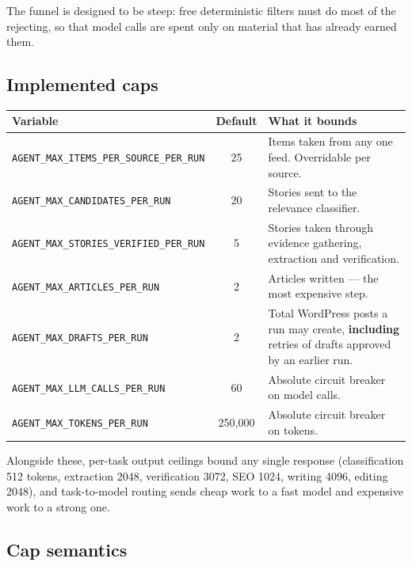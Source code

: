 \documentclass[11pt,a4paper]{article}
\newcommand{\var}[1]{\texttt{\small\hyphenpenalty=0\exhyphenpenalty=0\relax #1}}
\newcommand{\us}{\_\discretionary{}{}{}}
\begin{document}
The funnel is designed to be steep: free deterministic filters must do most of the
rejecting, so that model calls are spent only on material that has already earned
them.

\subsection{Implemented caps}

\begin{center}
\small
\begin{tabularx}{\textwidth}{@{}>{\RaggedRight}p{5.2cm} c >{\RaggedRight}X@{}}
\toprule
\textbf{Variable} & \textbf{Default} & \textbf{What it bounds} \\
\midrule
\var{AGENT\us MAX\us ITEMS\us PER\us SOURCE\us PER\us RUN} & 25 &
  Items taken from any one feed. Overridable per source. \\
\var{AGENT\us MAX\us CANDIDATES\us PER\us RUN} & 20 &
  Stories sent to the relevance classifier. \\
\var{AGENT\us MAX\us STORIES\us VERIFIED\us PER\us RUN} & 5 &
  Stories taken through evidence gathering, extraction and verification. \\
\var{AGENT\us MAX\us ARTICLES\us PER\us RUN} & 2 &
  Articles written --- the most expensive step. \\
\var{AGENT\us MAX\us DRAFTS\us PER\us RUN} & 2 &
  Total WordPress posts a run may create, \textbf{including} retries of drafts
  approved by an earlier run. \\
\var{AGENT\us MAX\us LLM\us CALLS\us PER\us RUN} & 60 &
  Absolute circuit breaker on model calls. \\
\var{AGENT\us MAX\us TOKENS\us PER\us RUN} & 250{,}000 &
  Absolute circuit breaker on tokens. \\
\bottomrule
\end{tabularx}
\end{center}

Alongside these, per-task output ceilings bound any single response
(classification 512 tokens, extraction 2048, verification 3072, SEO 1024, writing
4096, editing 2048), and task-to-model routing sends cheap work to a fast model
and expensive work to a strong one.

\subsection{Cap semantics}
\end{document}
